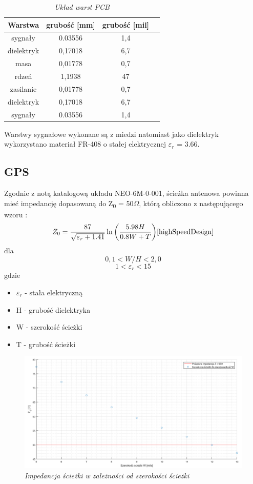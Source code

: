 \documentclass[eng,printmode]{mgr}
\begin{document}
\begin{table}[htb]
\def\arraystretch{1.3}%
\caption{\textit{ Układ warst PCB}}
\label{tab:pcbStack}
\begin{center}
\def\arraystretch{1.3}%
\begin{tabular}{ |c|c|c|c| }
\hline
Warstwa& grubość [mm] & grubość [mil] \\ 
\hline
sygnały & 0.03556 & 1,4 \\ 
\hline
dielektryk & 0,17018 & 6,7\\ 
\hline
masa & 0,01778 & 0,7\\ 
\hline
rdzeń & 1,1938 & 47\\ 
\hline
zasilanie & 0,01778 & 0,7\\ 
\hline
dielektryk & 0,17018 & 6,7\\ 
\hline
sygnały & 0.03556 & 1,4 \\ 
\hline
\end{tabular}
\end{center}
\end{table}

Warstwy sygnałowe wykonane są z miedzi natomiast jako dielektryk wykorzystano materiał FR-408 o stałej elektrycznej \textbf{$\varepsilon_r$} = 3.66.

\subsection*{GPS}
Zgodnie z notą katalogową układu NEO-6M-0-001, ścieżka antenowa powinna mieć impedancję dopasowaną do Z\textsubscript{0} = 50\textbf{$\Omega$}, którą obliczono z następującego wzoru :
\begin{equation}
Z_0= \frac{87}{\sqrt{\varepsilon_r + 1.41}}\ln{\left(\frac{5.98H}{0.8W + T}\right)} \label{eq:gps_z0} \cite{highSpeedDesign}
\end{equation}
dla 
$$
0,1 < W/H < 2,0
$$
$$
1 < \varepsilon_r < 15
$$
gdzie
\begin{itemize}
  \item \textbf{$\varepsilon_r$} - stała elektryczną 
  \item H - grubość dielektryka
  \item W - szerokość ścieżki
  \item T - grubość ścieżki
\end{itemize}
\newpage
\begin{figure}[!h]
    \centering
    \includegraphics[width=\textwidth]{plots/gpsZ0.png}
    \caption{\textit{ Impedancja ścieżki w zależności od szerokości ścieżki}}
\end{figure}
\end{document}
